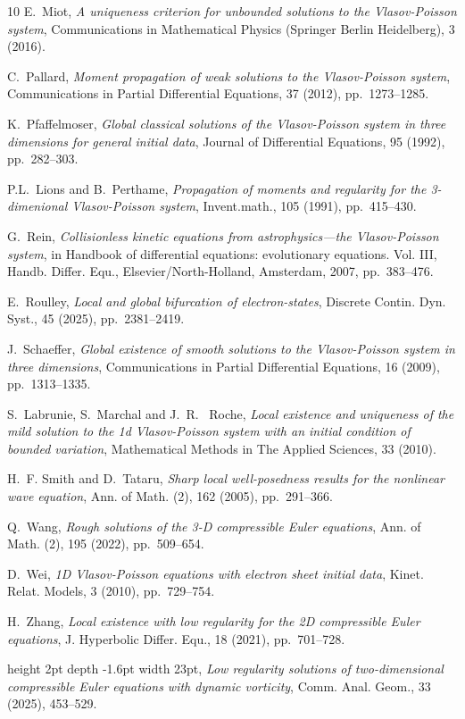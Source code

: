 \documentclass[11pt]{amsart}
\theoremstyle{definition}
\theoremstyle{remark}
\numberwithin{equation}{section}
\newcommand{\0}{\emptyset}
\begin{document}
\begin{thebibliography}{10}
		{\sc E.~Miot}, {\em A uniqueness criterion for unbounded solutions to the
			{V}lasov-{P}oisson system}, Communications in Mathematical Physics (Springer
		Berlin Heidelberg), 3 (2016).
		
		{\sc C.~Pallard}, {\em Moment propagation of weak solutions to the
			{V}lasov-{P}oisson system}, Communications in Partial Differential Equations, 37
		(2012), pp.~1273--1285.
		
		{\sc K.~Pfaffelmoser}, {\em Global classical solutions of the {V}lasov-{P}oisson
			system in three dimensions for general initial data}, Journal of Differential
		Equations, 95 (1992), pp.~282--303.
		
		{\sc P.L.~Lions and B.~Perthame}, {\em Propagation of moments and regularity for
			the 3-dimenional {V}lasov-{P}oisson system}, Invent.math., 105 (1991),
		pp.~415--430.
		
		{\sc G.~Rein}, {\em Collisionless kinetic equations from astrophysics---the
			{V}lasov-{P}oisson system}, in Handbook of differential equations:
		evolutionary equations. {V}ol. {III}, Handb. Differ. Equ.,
		Elsevier/North-Holland, Amsterdam, 2007, pp.~383--476.
		
		{\sc E.~Roulley}, {\em Local and global bifurcation of electron-states},
		Discrete Contin. Dyn. Syst., 45 (2025), pp.~2381--2419.
		
		{\sc J.~Schaeffer}, {\em Global existence of smooth solutions to the
			{V}lasov-{P}oisson system in three dimensions}, Communications in Partial
		Differential Equations, 16 (2009), pp.~1313--1335.
		
		{\sc S.~Labrunie, S.~Marchal and J.~R.~ Roche}, {\em Local existence and uniqueness of the mild solution to the 1d {V}lasov-{P}oisson system with an
			initial condition of bounded variation}, Mathematical Methods in The Applied
		Sciences, 33 (2010).
		
		{\sc H.~F. Smith and D.~Tataru}, {\em Sharp local well-posedness results for
			the nonlinear wave equation}, Ann. of Math. (2), 162 (2005), pp.~291--366.
		
		{\sc Q.~Wang}, {\em Rough solutions of the 3-{D} compressible {E}uler
			equations}, Ann. of Math. (2), 195 (2022), pp.~509--654.
		
		{\sc D.~Wei}, {\em 1{D} {V}lasov-{P}oisson equations with electron sheet
			initial data}, Kinet. Relat. Models, 3 (2010), pp.~729--754.
		
		{\sc H.~Zhang}, {\em Local existence with low regularity for the 2{D}
			compressible {E}uler equations}, J. Hyperbolic Differ. Equ., 18 (2021),
		pp.~701--728.
		
		\leavevmode\vrule height 2pt depth -1.6pt width 23pt,  {\em Low regularity solutions of two-dimensional compressible
			{E}uler equations with dynamic vorticity},
		{Comm. Anal. Geom.}, {33} {(2025)}, {453--529}.   
		
	\end{thebibliography} 
	
\end{document}
